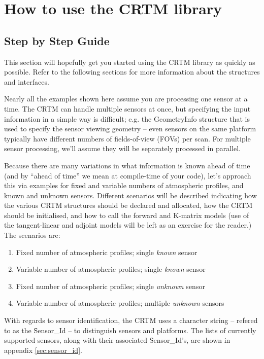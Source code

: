 \chapter{How to use the CRTM library}
\section{Step by Step Guide}
This section will hopefully get you started using the CRTM library as quickly as possible. Refer to the following sections for more information about the structures and interfaces.

Nearly all the examples shown here assume you are processing one sensor at a time. The CRTM can handle multiple sensors at once, but specifying the input information in a simple way is difficult; e.g. the GeometryInfo structure that is used to specify the sensor viewing geometry -- even sensors on the same platform typically have different numbers of fields-of-view (FOVs) per scan. For multiple sensor processing, we'll assume they will be separately processed in parallel.

Because there are many variations in what information is known ahead of time (and by ``ahead of time'' we mean at compile-time of your code), let's approach this via examples for fixed and variable numbers of atmospheric profiles, and known and unknown sensors. Different scenarios will be described indicating how the various CRTM structures should be declared and allocated, how the CRTM should be initialised, and how to call the forward and K-matrix models (use of the tangent-linear and adjoint models will be left as an exercise for the reader.) The scenarios are:\vspace{-2ex} 
\begin{enumerate}
  \item{Fixed number of atmospheric profiles; single \textit{known} sensor}
  \item{Variable number of atmospheric profiles; single \textit{known} sensor}
  \item{Fixed number of atmospheric profiles; single \textit{unknown} sensor}
  \item{Variable number of atmospheric profiles; multiple \textit{unknown} sensors}
\end{enumerate}
With regards to sensor identification, the CRTM uses a character string -- refered to as the \f{Sensor\_Id} -- to distinguish sensors and platforms. The lists of currently supported sensors, along with their associated \f{Sensor\_Id}'s, are shown in appendix \ref{sec:sensor_id}.


